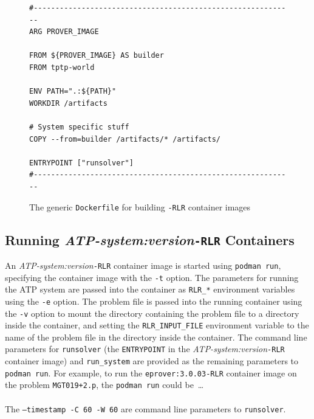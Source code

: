 \documentclass{easychair}
\begin{document}
\begin{figure}[htb]
{\small
\begin{verbatim}
#------------------------------------------------------------
ARG PROVER_IMAGE

FROM ${PROVER_IMAGE} AS builder
FROM tptp-world

ENV PATH=".:${PATH}"
WORKDIR /artifacts

# System specific stuff 
COPY --from=builder /artifacts/* /artifacts/

ENTRYPOINT ["runsolver"]
#------------------------------------------------------------
\end{verbatim}
}
\caption{The generic {\tt Dockerfile} for building {\tt -RLR} container images}
\label{Dockerfile---RLR}
\end{figure}

\subsection{Running {\em ATP-system:version}{\tt -RLR} Containers}
\label{Running}

An {\em ATP-system:version}{\tt -RLR} container image is started using {\tt podman run}, specifying 
the container image with the {\tt -t} option.
The parameters for running the ATP system are passed into the container as {\tt RLR\_*} 
environment variables using the {\tt -e} option.
The problem file is passed into the running container using the {\tt -v} option to mount 
the directory containing the problem file to a directory inside the container, and setting the
{\tt RLR\_INPUT\_FILE} environment variable to the name of the problem file in the directory 
inside the container.
The command line parameters for {\tt runsolver} (the {\tt ENTRYPOINT} in the 
{\em ATP-system:version}{\tt -RLR} container image) and {\tt run\_system} are provided as the
remaining parameters to {\tt podman run}.
For example, to run the {\tt eprover:3.0.03-RLR} container image on the problem {\tt MGT019+2.p},
the {\tt podman run} could be~\ldots \\
\hspace*{1cm}{\tt podman run -t eprover:3.0.03-RLR -v .:/artifacts/CWD \\
-e RLR\_INPUT\_FILE='/artifacts/CWD/MGT019+2.p' -e RLR\_CPU\_LIMIT='60' \\
-e RLR\_WC\_LIMIT='60' -e RLR\_MEM\_LIMIT='0' -e RLR\_INTENT='SAT' \\
--timestamp -C 60 -W 60 run\_system} \\
The {\tt --timestamp -C 60 -W 60} are command line parameters to {\tt runsolver}.
\end{document}
